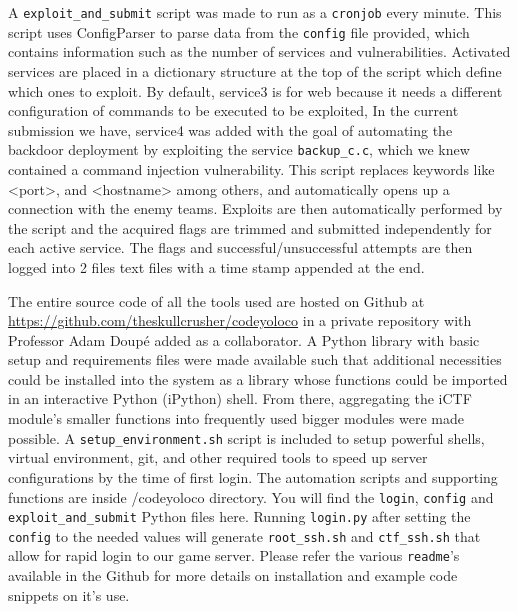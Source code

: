 \documentclass[12pt]{report}
\begin{document}
\noindent A \texttt{exploit\_and\_submit} script was made to run as a \texttt{cronjob} every minute. This script uses ConfigParser to parse data from the \texttt{config} file provided, which contains information such as the number of services and vulnerabilities. Activated services are placed in a dictionary structure at the top of the script which define which ones to exploit. 
By default, service3 is for web because it needs a different configuration of commands to be executed to be exploited, In the current submission we have, service4 was added with the goal of automating the backdoor deployment by exploiting the service \texttt{backup\_c.c}, which we knew contained a command injection vulnerability. This script replaces keywords like <port>, and <hostname> among others, and automatically opens up a connection with the enemy teams. Exploits are then automatically performed by the script and the acquired flags are trimmed and submitted independently for each active service. The flags and successful/unsuccessful attempts are then logged into 2 files text files with a time stamp appended at the end.


\noindent The entire source code of all the tools used are hosted on Github at \url{https://github.com/theskullcrusher/codeyoloco} in a private repository with Professor Adam Doup\'e added as a collaborator. A Python library with basic setup and requirements files were made available such that additional necessities could be installed into the system as a library whose functions could be imported in an interactive Python (iPython) shell. From there, aggregating the iCTF module's smaller functions into frequently used bigger modules were made possible. 
A \texttt{setup\_environment.sh} script is included to setup powerful shells, virtual environment, git, and other required tools to speed up server configurations by the time of first login. The automation scripts and supporting functions are inside /codeyoloco directory. You will find the \texttt{login}, \texttt{config} and \texttt{exploit\_and\_submit} Python files here. Running \texttt{login.py} after setting the \texttt{config} to the needed values will generate \texttt{root\_ssh.sh} and \texttt{ctf\_ssh.sh} that allow for rapid login to our game server.
Please refer the various \texttt{readme}'s available in the Github for more details on installation and example code snippets on it's use.


\end{document}
